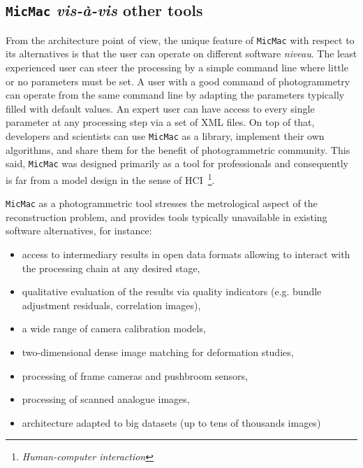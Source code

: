 \documentclass[twocolumn]{bmcart}%
\begin{document}
\subsection*{{\tt MicMac} \textit{vis-à-vis} other tools}
From the architecture point of view, the unique feature of {\tt MicMac} with respect to its alternatives is that the user can operate on different software \textit{niveau}. The least experienced user can steer the processing by a simple command line where little or no parameters must be set. A user with a good command of photogrammetry can operate from the same command line by adapting the parameters typically filled with default values. An expert user can have access to every single parameter at any processing step via a set of XML files. On top of that, developers and scientists can use {\tt MicMac} as a library, implement their own algorithms, and share them for the benefit of photogrammetric community. This said, {\tt MicMac} was designed primarily as a tool for professionals and consequently is far from a model design in the sense of HCI~\footnote{\textit{Human-computer interaction}}.\par 
%
{\tt MicMac} as a photogrammetric tool stresses the metrological aspect of the reconstruction problem, and provides tools typically unavailable in existing software alternatives, for instance:
\begin{itemize}
\item access to intermediary results in open data formats allowing to interact with the processing chain at any desired stage,
\item qualitative evaluation of the results via quality indicators (e.g. bundle adjustment residuals, correlation images),
\item a wide range of camera calibration models,
\item two-dimensional dense image matching for deformation studies,
\item processing of frame cameras and pushbroom sensors,
\item processing of scanned analogue images,
\item architecture adapted to big datasets (up to tens of thousands images)
\end{itemize}
%
%
\end{document}
